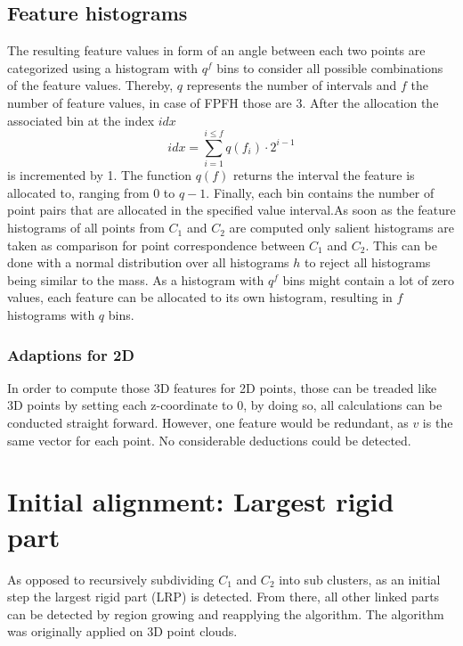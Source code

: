 \subsection{Feature histograms}
The resulting feature values in form of an angle between each two points are categorized using a histogram with $q^f$ bins to consider all possible combinations of the feature values. Thereby, $q$ represents the number of intervals and $f$ the number of feature values, in case of FPFH those are 3. After the allocation the associated bin at the index $idx$
\begin{equation}
idx = \displaystyle\sum_{i=1}^{i \leq f}q(f_i) \cdot 2^{i-1}
\end{equation}
is incremented by 1. The function $q(f)$ returns the interval the feature is allocated to, ranging from 0 to $q - 1$. Finally, each bin contains the number of point pairs that are allocated in the specified value interval.As soon as the feature histograms of all points from $C_1$ and $C_2$ are computed only salient histograms are taken as comparison for point correspondence between $C_1$ and $C_2$. This can be done with a normal distribution over all histograms $h$ to reject all histograms being similar to the mass. As a histogram with $q^f$ bins might contain a lot of zero values, each feature can be allocated to its own histogram, resulting in $f$ histograms with $q$ bins.

\subsubsection{Adaptions for 2D}
In order to compute those 3D features for 2D points, those can be treaded like 3D points by setting each z-coordinate to 0, by doing so, all calculations can be conducted straight forward. However, one feature would be redundant, as $v$ is the same vector for each point. No considerable deductions could be detected. 

\section{Initial alignment: Largest rigid part}
\label{LRP}

As opposed to recursively subdividing $C_1$ and $C_2$ into sub clusters, as an initial step the largest rigid part (LRP) is detected. From there, all other linked parts can be detected by region growing and reapplying the algorithm.
The algorithm was originally applied on 3D point clouds.

